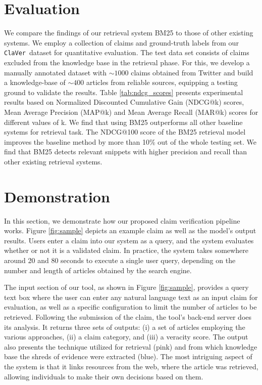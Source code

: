 \documentclass[11pt]{article}
\newcommand{\dataset}{\texttt{ClaVer}}
\begin{document}
\section{Evaluation}


We compare the findings of our retrieval system BM25 to those of other existing systems. We employ a collection of claims and ground-truth labels from our \dataset\ dataset for quantitative evaluation. The test data set consists of claims excluded from the knowledge base in the retrieval phase. For this, we develop a manually annotated dataset with $\sim1000$ claims obtained from Twitter and build a knowledge-base of $\sim400$ articles from reliable sources, equipping a testing ground to validate the results. Table \ref{tab:ndcg_scores} presents experimental results based on Normalized Discounted Cumulative Gain (NDCG@k) scores, Mean Average Precision (MAP@k) and Mean Average Recall (MAR@k) scores for different values of k. We find that using BM25 outperforms all other baseline systems for retrieval task. The NDCG@100 score of the BM25 retrieval model improves the baseline method by more than 10\% out of the whole testing set.  We find that BM25 detects relevant snippets with higher precision and recall than other existing retrieval systems.  %




\section{Demonstration}
In this section, we demonstrate how our proposed claim verification pipeline works. Figure \ref{fig:sample} depicts an example claim as well as the model's output results. Users enter a claim into our system as a query, and the system evaluates whether or not it is a validated claim. In practice, the system takes somewhere around 20 and 80 seconds to execute a single user query, depending on the number and length of articles obtained by the search engine.

The input section of our tool, as shown in Figure \ref{fig:sample}, provides a query text box where the user can enter any natural language text as an input claim for evaluation, as well as a specific configuration to limit the number of articles to be retrieved. Following the submission of the claim, the tool's back-end server does its analysis. It returns three sets of outputs: (i) a set of articles employing the various approaches, (ii) a claim category, and (iii) a veracity score. The output also presents the technique utilized for retrieval (pink) and from which knowledge base the shreds of evidence were extracted (blue). The most intriguing aspect of the system is that it links resources from the web, where the article was retrieved, allowing individuals to make their own decisions based on them. 
 
\end{document}
